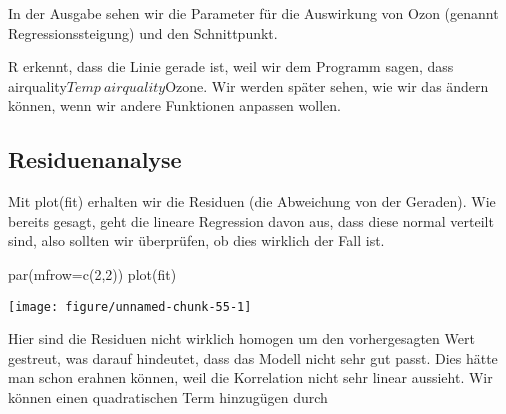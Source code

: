 \documentclass[a4paper,twoside]{tufte-book}\usepackage[]{graphicx}\usepackage[]{color}
\makeatletter
\def\maxwidth{ %
	\ifdim\Gin@nat@width>\linewidth
	\linewidth
	\else
	\Gin@nat@width
	\fi
}
\makeatother
\begin{document}
\begin{appendices}
\begin{Schunk}
\end{Schunk}

In der Ausgabe sehen wir die Parameter für die Auswirkung von Ozon (genannt Regressionssteigung) und den Schnittpunkt.

R erkennt, dass die Linie gerade ist, weil wir dem Programm sagen, dass airquality$Temp~airquality$Ozone. Wir werden später sehen, wie wir das ändern können, wenn wir andere Funktionen anpassen wollen. 

\subsection{Residuenanalyse}

Mit plot(fit) erhalten wir die Residuen (die Abweichung von der Geraden). Wie bereits gesagt, geht die lineare Regression davon aus, dass diese normal verteilt sind, also sollten wir überprüfen, ob dies wirklich der Fall ist.

\begin{Schunk}
\begin{Sinput}
par(mfrow=c(2,2))
plot(fit)
\end{Sinput}

\texttt{[image: figure/unnamed-chunk-55-1]} \end{Schunk}

Hier sind die Residuen nicht wirklich homogen um den vorhergesagten Wert gestreut, was darauf hindeutet, dass das Modell nicht sehr gut passt. Dies hätte man schon erahnen können, weil die Korrelation nicht sehr linear aussieht. Wir können einen quadratischen Term hinzugügen durch


\begin{Schunk}
\begin{Soutput}


\end{Soutput}
\end{Schunk}
\end{appendices}
\end{document}
